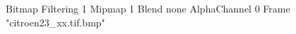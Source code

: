 {Bitmap
	{Filtering 1}
	{Mipmap 1}
	{Blend none}
	{AlphaChannel 0}
	{Frame "citroen23_xx.tif.bmp"}
}
